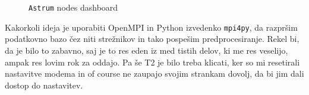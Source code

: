 \documentclass[a4paper]{article}
\begin{document}
\begin{figure}[H]
    \caption{\texttt{Astrum} nodes dashboard}
    \label{fig:astrum-dash}
\end{figure}

Kakorkoli ideja je uporabiti OpenMPI in Python izvedenko \texttt{mpi4py}, da razpršim podatkovno
bazo čez niti strežnikov in tako pospešim predprocesiranje. Rekel bi, da je bilo to zabavno, saj je 
to res eden iz med tistih delov, ki me res veselijo, ampak res lovim rok za oddajo. Pa še T2 je 
bilo treba klicati, ker so mi resetirali nastavitve modema in of course ne zaupajo svojim strankam
dovolj, da bi jim dali dostop do nastavitev. \\
\end{document}
